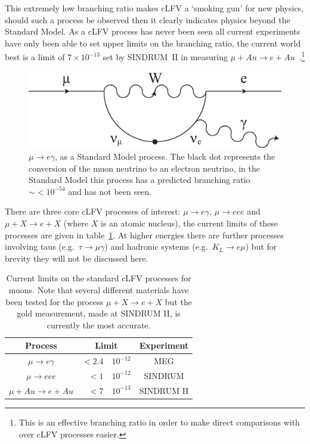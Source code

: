 This extremely low branching ratio makes cLFV a `smoking gun' for new physics, should such a process be observed then it clearly indicates physics beyond the Standard Model. As a cLFV process has never been seen all current experiments have only been able to set upper limits on the branching ratio, the current world best is a limit of \(7\times10^{-13}\) set by SINDRUM~II in measuring \(\mu+Au\rightarrow e+Au\)~\cite{sindrum_2_mu_ag_e}.\footnote{This is an effective branching ratio in order to make direct comparisons with over cLFV processes easier.}

\begin{figure}[hptb]
  \centering
    \includegraphics[width=.7\textwidth]{images/cLFV_mu-e_conversion.eps}
  \caption{\(\mu\rightarrow e\gamma\), as a Standard Model process. The black dot represents the conversion of the muon neutrino to an electron neutrino, in the Standard Model this process has a predicted branching ratio \(\sim <10^{-54} \) and has not been seen.}
  \label{fig:images_cLFV_mu-e_conversion}
\end{figure}

There are three core cLFV processes of interest: \( \mu\rightarrow e\gamma \), \( \mu\rightarrow eee \) and  \(\mu+X\rightarrow e+X \) (where \(X\) is an atomic nucleus), the current limits of these processes are given in table~\ref{tab:clfv}. At higher energies there are further processes involving taus (e.g.\ \(\tau\rightarrow\mu\gamma\)) and hadronic systems (e.g.\ \(K_L\rightarrow e\mu\)) but for brevity they will not be discussed here. 
\begin{table}
  \begin{center}
  \begin{tabular}{c | r@{\( \times \)}l | c}
    Process                  &  \multicolumn{2}{c|}{Limit}  &  Experiment \\
    \hline
    \(\mu\rightarrow e\gamma\)  &  \(<2.4\) & \(10^{-12}\)  &  MEG        \\
    \(\mu\rightarrow eee\)      &    \(<1\) & \(10^{-12}\)  &  SINDRUM    \\
    \(\mu+Au\rightarrow e+Au\)  &    \(<7\) & \(10^{-13}\)  &  SINDRUM II \\
    
  \end{tabular}
  \end{center}
  \caption{Current limits on the standard cLFV processes for muons. Note that several different materials have been tested for the process \( \mu + X\rightarrow e + X \) but the gold measurement, made at SINDRUM II, is currently the most accurate.}
  \label{tab:clfv}
\end{table}


